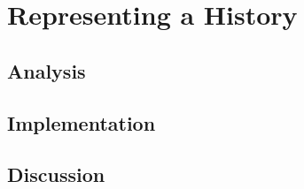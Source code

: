 \chapter{Representing a History}
	\section{Analysis} %
	\section{Implementation} %
	\section{Discussion} %